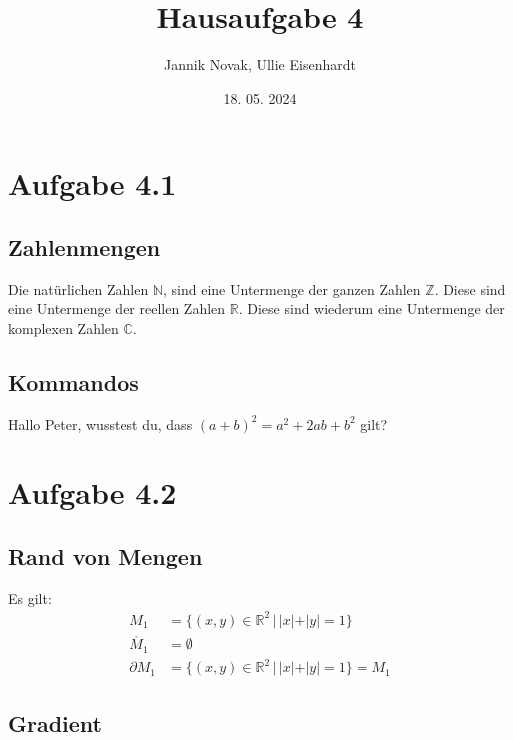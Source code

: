 \documentclass{article}
\title{Hausaufgabe 4}
\author{Jannik Novak, Ullie Eisenhardt}
\date{18. 05. 2024}
\newcommand{\N}{\mathbb{N}}
\newcommand{\Z}{\mathbb{Z}}
\newcommand{\R}{\mathbb{R}}
\newcommand{\C}{\mathbb{C}}
\newcommand{\binomial}[2]{(#1 + #2)^2}
\newcommand{\hallo}[1]{Hallo #1,}
\begin{document}
\maketitle

\clearpage

\tableofcontents

\clearpage

\section{Aufgabe 4.1}

\subsection{Zahlenmengen}

Die natürlichen Zahlen $\N$, sind eine Untermenge der ganzen Zahlen $\Z$. Diese sind eine Untermenge der reellen Zahlen $\R$. Diese sind wiederum eine Untermenge der komplexen Zahlen $\C$.

\subsection{Kommandos}

\hallo{Peter} wusstest du, dass $\binomial{a}{b} = a^2 + 2ab + b^2$ gilt? 

\section{Aufgabe 4.2}

\subsection{Rand von Mengen}

Es gilt:
%
\begin{align*}
    M_1 & = \{(x,y) \in \R^2 \, | \, |x| + |y| = 1 \} \\
    \mathring{M_1} & = \emptyset \\
    \partial M_1 & = \{(x,y) \in \R^2 \, | \, |x| + |y| = 1 \} = M_1
\end{align*}
%

\subsection{Gradient}
\end{document}
